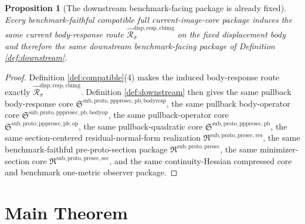 \documentclass[11pt]{article}
\newcommand{\PrePreProtoSectionPullbackCore}{\mathfrak S^{\mathrm{sub,proto,pppresec,pb}}}
\newcommand{\PullbackOperatorCore}{\mathfrak S^{\mathrm{sub,proto,pppresec,pb,op}}}
\newcommand{\PullbackBodyOperatorCore}{\mathfrak S^{\mathrm{sub,proto,pppresec,pb,bodyop}}}
\newcommand{\PullbackBodyResponseCore}{\mathfrak S^{\mathrm{sub,proto,pppresec,pb,bodyresp}}}
\newcommand{\PreProtoSectionResidualPackage}{\mathfrak R^{\mathrm{sub,proto,presec,res}}}
\newcommand{\PreProtoSectionPackage}{\mathfrak R^{\mathrm{sub,proto,presec}}}
\newcommand{\PreProtoSectionMinSectionCore}{\mathfrak R^{\mathrm{sub,proto,presec,sec}}}
\newcommand{\CoreForcedBodyResponse}[1]{\widehat{\mathscr R}_{#1}^{\mathrm{disp,resp,cbimg}}}
\newtheorem{proposition}{Proposition}
\begin{document}
\begin{proposition}[The downstream benchmark-facing package is already fixed]
\label{prop:downstream}
Every benchmark-faithful compatible full current-image-core package induces the same current body-response route \(\CoreForcedBodyResponse{\sigma}\) on the fixed displacement body and therefore the same downstream benchmark-facing package of Definition \ref{def:downstream}.
\end{proposition}

\begin{proof}
Definition \ref{def:compatible}(4) makes the induced body-response route exactly \(\CoreForcedBodyResponse{\sigma}\). Definition \ref{def:downstream} then gives the same pullback body-response core \(\PullbackBodyResponseCore\), the same pullback body-operator core \(\PullbackBodyOperatorCore\), the same pullback-operator core \(\PullbackOperatorCore\), the same pullback-quadratic core \(\PrePreProtoSectionPullbackCore\), the same section-centered residual-normal-form realization \(\PreProtoSectionResidualPackage\), the same benchmark-faithful pre-proto-section package \(\PreProtoSectionPackage\), the same minimizer-section core \(\PreProtoSectionMinSectionCore\), and the same continuity-Hessian compressed core and benchmark one-metric observer package.
\end{proof}

\section{Main Theorem}
\end{document}
